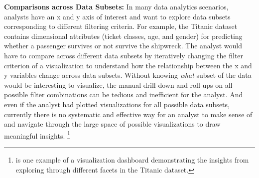 
\npar \textbf{Comparisons across Data Subsets:} In many data analytics scenarios, analysts have an x and y axis of interest and want to explore data subsets corresponding to different filtering criteria. For example, the Titanic dataset contains dimensional attributes (ticket classes, age, and gender) for predicting whether a passenger survives or not survive the shipwreck. The analyst would have to compare across different data subsets by iteratively changing the filter criterion of a visualization to understand how the relationship between the x and y variables change across data subsets.
\npar Without knowing \textit{what} subset of the data would be interesting to visualize, the manual drill-down and roll-ups on all possible filter combinations can be tedious and inefficient for the analyst. And even if the analyst had plotted visualizations for all possible data subsets, currently there is no systematic and effective way for an analyst to make sense of and navigate through the large space of possible visualizations to draw meaningful insights. \footnote{\cite{anand} is one example of a visualization dashboard demonstrating the insights from exploring through different facets in the Titanic dataset.}

